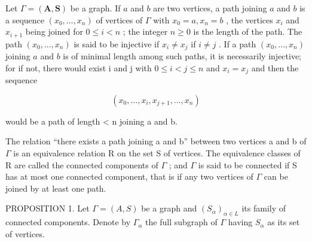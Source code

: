 
Let \(\Gamma = (\mathbf{A},\mathbf{S})\) be a graph. If \(a\) and \(b\) are two vertices, a path joining \(a\) and \(b\) is a sequence \((x_0,\ldots ,x_n)\) of vertices of \(\Gamma\) with \(x_0 = a,x_n = b\) , the vertices \(x_{i}\) and \(x_{i + 1}\) being joined for \(0\leqslant i < n\) ; the integer \(n\geqslant 0\) is the length of the path. The path \((x_0,\ldots ,x_n)\) is said to be injective if \(x_{i}\neq x_{j}\) if \(i\neq j\) . If a path \((x_0,\ldots ,x_n)\) joining \(a\) and \(b\) is of minimal length among such paths, it is necessarily injective; for if not, there would exist i and j with \(0 \leqslant i < j \leqslant n\) and \(x_{i} = x_{j}\) and then the sequence

\[
\left(x _ {0}, \dots , x _ {i}, x _ {j + 1}, \dots , x _ {n}\right)
\]

would be a path of length \textless{} n joining a and b.

The relation ``there exists a path joining a and b'' between two vertices a and b of \(\Gamma\) is an equivalence relation R on the set S of vertices. The equivalence classes of R are called the connected components of \(\Gamma\) ; and \(\Gamma\) is said to be connected if S has at most one connected component, that is if any two vertices of \(\Gamma\) can be joined by at least one path.

PROPOSITION 1. Let \(\Gamma = (A, S)\) be a graph and \((S_{\alpha})_{\alpha \in L}\) its family of connected components. Denote by \(\Gamma_{\alpha}\) the full subgraph of \(\Gamma\) having \(S_{\alpha}\) as its set of vertices.

